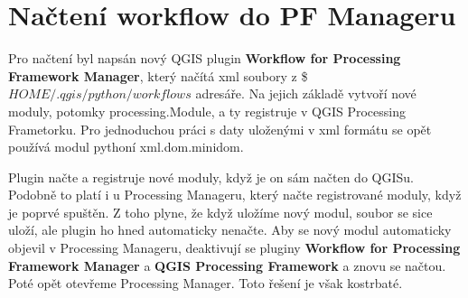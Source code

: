 \newpage
\section{Načtení workflow do PF Manageru}
Pro načtení byl napsán nový QGIS plugin \textbf{Workflow for Processing Framework Manager}, který načítá xml soubory z \$$HOME/.qgis/python/workflows$ adresáře. Na jejich základě vytvoří nové moduly, potomky processing.Module, a ty registruje v QGIS Processing Frametorku. Pro jednoduchou práci s daty uloženými v xml formátu se opět používá modul pythoní xml.dom.minidom.

Plugin načte a registruje nové moduly, když je on sám načten do QGISu. Podobně to platí i u Processing Manageru, který načte registrované moduly, když je poprvé spuštěn. Z toho plyne, že když uložíme nový modul, soubor se sice uloží, ale plugin ho hned automaticky nenačte. Aby se nový modul automaticky objevil v Processing Manageru, deaktivují se pluginy \textbf{Workflow for Processing Framework Manager} a \textbf{QGIS Processing Framework} a znovu se načtou. Poté opět otevřeme Processing Manager. Toto řešení je však kostrbaté.